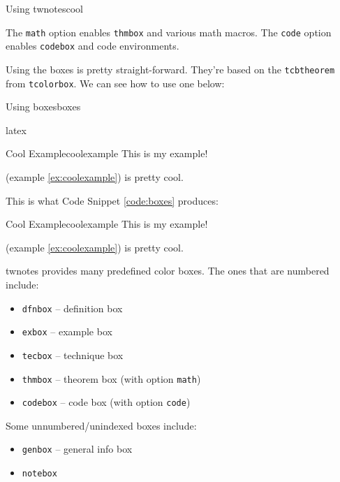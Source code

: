 \documentclass[math,code,cn,localfonts]{twnotes} %
\begin{document}
\begin{codebox}{Using twnotes}{cool}
\end{codebox}
	
	The \texttt{math} option enables \texttt{thmbox} and various math macros. The \texttt{code} option enables \texttt{codebox} and code environments.
	
	Using the boxes is pretty straight-forward. They're based on the \texttt{tcbtheorem} from \texttt{tcolorbox}. We can see how to use one below:
	
\begin{codebox}{Using boxes}{boxes}
\begin{twcode}{latex}
\begin{exbox}{Cool Example}{coolexample}
    This is my example!
\end{exbox}
 (example \ref{ex:coolexample}) is pretty cool.
\end{twcode}
\end{codebox}
	
	This is what Code Snippet \ref{code:boxes} produces:
	
	\begin{notebox}
		\begin{exbox}{Cool Example}{coolexample}
			This is my example!
		\end{exbox}
		 (example \ref{ex:coolexample}) is pretty cool.
	\end{notebox}
	
	twnotes provides many predefined color boxes. The ones that are numbered include:
	\begin{itemize}[noitemsep]
		\item \texttt{dfnbox} -- definition box
		\item \texttt{exbox} -- example box
		\item \texttt{tecbox} -- technique box
		\item \texttt{thmbox} -- theorem box (with option \texttt{math})
		\item \texttt{codebox} -- code box (with option \texttt{code})
	\end{itemize}
	
	Some unnumbered/unindexed boxes include:
	\begin{itemize}[noitemsep]
		\item \texttt{genbox} -- general info box
		\item \texttt{notebox}
	\end{itemize}
	
\end{document}
